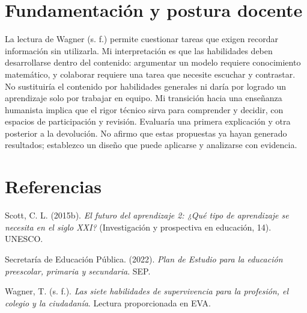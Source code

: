 \documentclass[spanish,letterpaper,oneside]{article}
\begin{document}
\section{Fundamentación y postura docente}
La lectura de Wagner (s. f.) permite cuestionar tareas que exigen recordar información sin utilizarla. Mi interpretación es que las habilidades deben desarrollarse dentro del contenido: argumentar un modelo requiere conocimiento matemático, y colaborar requiere una tarea que necesite escuchar y contrastar. No sustituiría el contenido por habilidades generales ni daría por logrado un aprendizaje solo por trabajar en equipo.
Mi transición hacia una enseñanza humanista implica que el rigor técnico sirva para comprender y decidir, con espacios de participación y revisión. Evaluaría una primera explicación y otra posterior a la devolución. No afirmo que estas propuestas ya hayan generado resultados; establezco un diseño que puede aplicarse y analizarse con evidencia.

\section*{Referencias}
{\setlength{\parskip}{6pt}
\par\hangindent=1.27cm  Scott, C. L. (2015b). \textit{El futuro del aprendizaje 2: ¿Qué tipo de aprendizaje se necesita en el siglo XXI?} (Investigación y prospectiva en educación, 14). UNESCO.
\par\hangindent=1.27cm  Secretaría de Educación Pública. (2022). \textit{Plan de Estudio para la educación preescolar, primaria y secundaria}. SEP.
\par\hangindent=1.27cm  Wagner, T. (s. f.). \textit{Las siete habilidades de supervivencia para la profesión, el colegio y la ciudadanía}. Lectura proporcionada en EVA.
}
\end{document}

